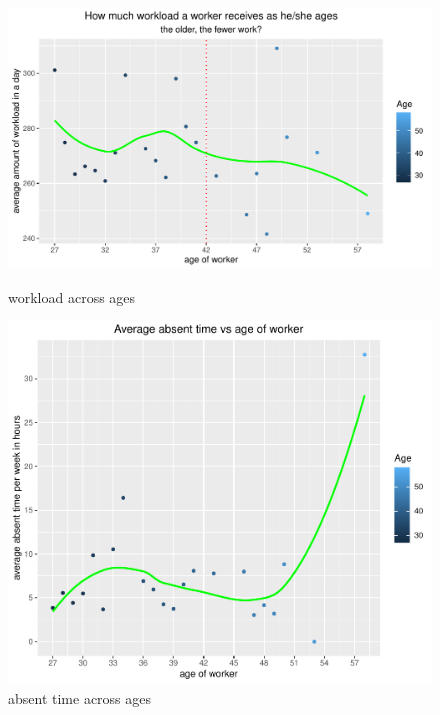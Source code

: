 \documentclass{article}
\begin{document}
\begin{figure}[h]
 \centering
 \begin{minipage}[b]{.5\textwidth}
  \includegraphics[width=1\linewidth]{age_workload.pdf}
  \caption{workload across ages}
 \end{minipage}
 \begin{minipage}[b]{.4\textwidth}
  \includegraphics[width=1\linewidth]{absentTime_age.pdf}
  \caption{absent time across ages}
 \end{minipage}
\end{figure}
\end{document}

